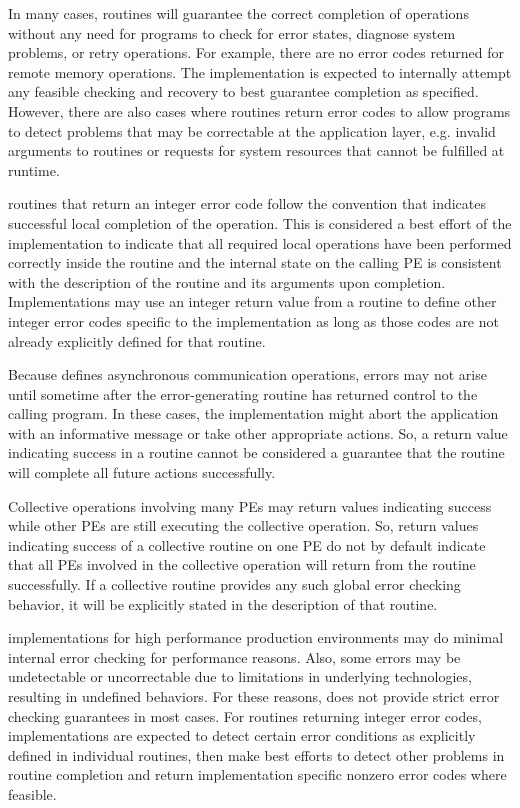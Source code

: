 In many cases, \openshmem routines will guarantee the correct completion of operations without any need for programs to check for error states, diagnose system problems, or retry operations. For example, there are no error codes returned for remote memory operations. The implementation is expected to internally attempt any feasible checking and recovery to best guarantee completion as specified. However, there are also cases where routines return error codes to allow programs to detect problems that may be correctable at the application layer, e.g. invalid arguments to routines or requests for system resources that cannot be fulfilled at runtime.

\CorCpp routines that return an integer error code follow the convention that  indicates successful local completion of the operation. This is considered a best effort of the implementation to indicate that all required local operations have been performed correctly inside the routine and the internal \openshmem state on the calling \ac{PE} is consistent with the description of the routine and its arguments upon completion. Implementations may use an integer return value from a routine to define other integer error codes specific to the implementation as long as those codes are not already explicitly defined for that routine.

Because \openshmem defines asynchronous communication operations, errors may not arise until sometime after the error-generating routine has returned control to the calling program. In these cases, the implementation might abort the application with an informative message or take other appropriate actions. So, a return value indicating success in a routine cannot be considered a guarantee that the routine will complete all future actions successfully.

Collective operations involving many \acp{PE} may return values indicating success while other \acp{PE} are still executing the collective operation. So, return values indicating success of a collective routine on one \ac{PE} do not by default indicate that all \acp{PE} involved in the collective operation will return from the routine successfully. If a collective routine provides any such global error checking behavior, it will be explicitly stated in the description of that routine.

\openshmem implementations for high performance production environments may do minimal internal error checking for performance reasons. Also, some errors may be undetectable or uncorrectable due to limitations in underlying technologies, resulting in undefined behaviors. For these reasons, \openshmem does not provide strict error checking guarantees in most cases. For \CorCpp routines returning integer error codes, implementations are expected to detect certain error conditions as explicitly defined in individual routines, then make best efforts to detect other problems in routine completion and return implementation specific nonzero error codes where feasible.

